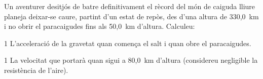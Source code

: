 Un aventurer desitjós de batre definitivament el rècord del món de caiguda lliure planeja deixar-se caure, partint d'un estat de repòs, des d'una altura de 330,0~km i no obrir el paracaigudes fins als 50,0~km d'altura. Calculeu:

\begin{apartat}{1}
L'acceleració de la gravetat quan comença el salt i quan obre el paracaigudes.
\end{apartat}

\begin{apartat}{1}
La velocitat que portarà quan sigui a 80,0~km d'altura (considereu negligible la resistència de l'aire).
\end{apartat}


